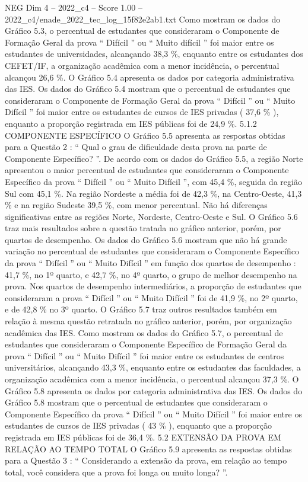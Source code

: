 \begin{textsample}{NEG Dim 4 – 2022\_c4 – Score 1.00 – 2022\_c4/enade\_2022\_tec\_log\_15f82e2ab1.txt}
Como mostram os dados do Gráfico 5.3, o percentual de estudantes que consideraram o Componente de Formação Geral da prova “ Difícil ” ou “ Muito difícil ” foi maior entre os estudantes de universidades, alcançando 38,3 \%, enquanto entre os estudantes dos CEFET/IF, a organização acadêmica com a menor incidência, o percentual alcançou 26,6 \%.
O Gráfico 5.4 apresenta os dados por categoria administrativa das IES.
Os dados do Gráfico 5.4 mostram que o percentual de estudantes que consideraram o Componente de Formação Geral da prova “ Difícil ” ou “ Muito Difícil ” foi maior entre os estudantes de cursos de IES privadas ( 37,6 \% ), enquanto a proporção registrada em IES públicas foi de 24,9 \%. 5.1.2 COMPONENTE ESPECÍFICO O Gráfico 5.5 apresenta as respostas obtidas para a Questão 2 : “ Qual o grau de dificuldade desta prova na parte de Componente Específico? ”.
De acordo com os dados do Gráfico 5.5, a região Norte apresentou o maior percentual de estudantes que consideraram o Componente Específico da prova “ Difícil ” ou “ Muito Difícil ”, com 45,4 \%, seguida da região Sul com 45,1 \%.
Na região Nordeste a média foi de 42,3 \%, na Centro-Oeste, 41,3 \% e na região Sudeste 39,5 \%, com menor percentual.
Não há diferenças significativas entre as regiões Norte, Nordeste, Centro-Oeste e Sul.
O Gráfico 5.6 traz mais resultados sobre a questão tratada no gráfico anterior, porém, por quartos de desempenho.
Os dados do Gráfico 5.6 mostram que não há grande variação no percentual de estudantes que consideraram o Componente Específico da prova “ Difícil ” ou “ Muito Difícil ” em função dos quartos de desempenho : 41,7 \%, no 1º quarto, e 42,7 \%, no 4º quarto, o grupo de melhor desempenho na prova.
Nos quartos de desempenho intermediários, a proporção de estudantes que consideraram a prova “ Difícil ” ou “ Muito Difícil ” foi de 41,9 \%, no 2º quarto, e de 42,8 \% no 3º quarto.
O Gráfico 5.7 traz outros resultados também em relação à mesma questão retratada no gráfico anterior, porém, por organização acadêmica das IES.
Como mostram os dados do Gráfico 5.7, o percentual de estudantes que consideraram o Componente Específico de Formação Geral da prova “ Difícil ” ou “ Muito Difícil ” foi maior entre os estudantes de centros universitários, alcançando 43,3 \%, enquanto entre os estudantes das faculdades, a organização acadêmica com a menor incidência, o percentual alcançou 37,3 \%.
O Gráfico 5.8 apresenta os dados por categoria administrativa das IES.
Os dados do Gráfico 5.8 mostram que o percentual de estudantes que consideraram o Componente Específico da prova “ Difícil ” ou “ Muito Difícil ” foi maior entre os estudantes de cursos de IES privadas ( 43 \% ), enquanto que a proporção registrada em IES públicas foi de 36,4 \%. 5.2 EXTENSÃO DA PROVA EM RELAÇÃO AO TEMPO TOTAL O Gráfico 5.9 apresenta as respostas obtidas para a Questão 3 : “ Considerando a extensão da prova, em relação ao tempo total, você considera que a prova foi longa ou muito longa? ”.

\end{textsample}
